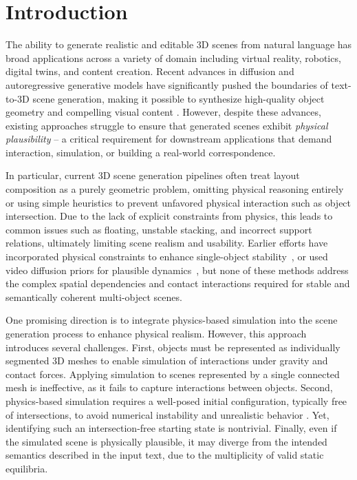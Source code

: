 

\section{Introduction}


The ability to generate realistic and editable 3D scenes from natural language has broad applications across a variety of domain including virtual reality, robotics, digital twins, and content creation. Recent advances in diffusion and autoregressive generative models have significantly pushed the boundaries of text-to-3D scene generation, making it possible to synthesize high-quality object geometry and compelling visual content \cite{lin2023magic3d,metzer2023latent,michel2022text2mesh,poole2022dreamfusion,chen2025mar,chen2024sar3d,huang2024midi,gao2024graphdreamer}. However, despite these advances, existing approaches struggle to ensure that generated scenes exhibit \textit{physical plausibility} -- a critical requirement for downstream applications that demand interaction, simulation, or building a real-world correspondence.

In particular, current 3D scene generation pipelines \cite{huang2024midi,gao2024graphdreamer} often treat layout composition as a purely geometric problem, omitting physical reasoning entirely or using simple heuristics to prevent unfavored physical interaction such as object intersection. Due to the lack of explicit constraints from physics, this leads to common issues such as floating, unstable stacking, and incorrect support relations, ultimately limiting scene realism and usability. Earlier efforts have incorporated physical constraints to enhance single-object stability~\cite{guo2024physically,chen2024atlas3d}, or used video diffusion priors for plausible dynamics~\cite{zhang2024physdreamer}, but none of these methods address the complex spatial dependencies and contact interactions required for stable and semantically coherent multi-object scenes.

One promising direction is to integrate physics-based simulation into the scene generation process to enhance physical realism. However, this approach introduces several challenges. First, objects must be represented as individually segmented 3D meshes to enable simulation of interactions under gravity and contact forces. Applying simulation to scenes represented by a single connected mesh is ineffective, as it fails to capture interactions between objects. Second, physics-based simulation requires a well-posed initial configuration, typically free of intersections, to avoid numerical instability and unrealistic behavior \cite{li2020incremental}. Yet, identifying such an intersection-free starting state is nontrivial. Finally, even if the simulated scene is physically plausible, it may diverge from the intended semantics described in the input text, due to the multiplicity of valid static equilibria. 


